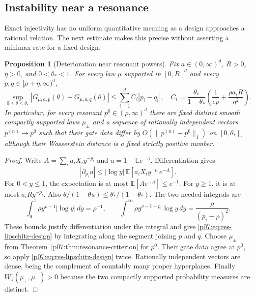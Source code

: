\documentclass[11pt,letterpaper]{article}
\newtheorem{proposition}[theorem]{Proposition}
\theoremstyle{definition}
\theoremstyle{remark}
\newcommand{\1}{\mathbf 1}
\begin{document}
\subsection{Instability near a resonance}

Exact injectivity has no uniform quantitative meaning as a design
approaches a rational relation.  The next estimate makes this precise
without asserting a minimax rate for a fixed design.

\begin{proposition}[Deterioration near resonant powers]
\label{p07:prop:res-stability}
Fix $a\in(0,\infty)^d$, $R>0$, $\eta>0$, and
$0<\theta_*<1$.  For every law $\mu$ supported in $[0,R]^d$ and
every $p,q\in[\rho+\eta,\infty)^d$,
\begin{equation}\label{p07:eq:res-lipschitz-design}
 \sup_{0\leq\theta\leq\theta_*}
 |G_{\mu,a,p}(\theta)-G_{\mu,a,q}(\theta)|
 \leq\sum_{i=1}^d C_i|p_i-q_i|,
 \quad
 C_i=\frac{\theta_*}{1-\theta_*}
 \left(\frac1{e\rho}+\frac{\rho a_iR}{\eta^2}\right).
\end{equation}
In particular, for every resonant $p^0\in(\rho,\infty)^d$ there
are fixed distinct smooth compactly supported laws $\mu_\pm$ and
a sequence of rationally independent vectors $p^{(n)}\to p^0$ such
that their gate data differ by $O(\|p^{(n)}-p^0\|_1)$ on
$[0,\theta_*]$, although their Wasserstein distance is a fixed
strictly positive number.
\end{proposition}

\begin{proof}
Write $A=\sum_i a_iX_i y^{-p_i}$ and
$u=1-\mathbb E e^{-A}$.  Differentiation gives
\[
 |\partial_{p_i}u|
 \leq |\log y|\,\mathbb E[a_iX_i y^{-p_i}e^{-A}].
\]
For $0<y\leq1$, the expectation is at most
$\mathbb E[Ae^{-A}]\leq e^{-1}$.
For $y\geq1$, it is at most $a_iR y^{-p_i}$.
Also $\theta/(1-\theta u)\leq\theta_* /(1-\theta_*)$.
The two needed integrals are
\[
 \int_0^1\rho y^{\rho-1}|\log y|\,dy=\rho^{-1},
 \qquad
 \int_1^\infty\rho y^{\rho-1-p_i}\log y\,dy
       =\frac{\rho}{(p_i-\rho)^2}.
\]
These bounds justify differentiation under the integral and give
\eqref{p07:eq:res-lipschitz-design} by integrating along the segment
joining $p$ and $q$.
Choose $\mu_\pm$ from Theorem~\ref{p07:thm:resonance-criterion}
for $p^0$.  Their gate data agree at $p^0$, so apply
\eqref{p07:eq:res-lipschitz-design} twice.  Rationally independent vectors
are dense, being the complement of countably many proper hyperplanes.
Finally $W_1(\mu_+,\mu_-)>0$ because the two compactly supported
probability measures are distinct.
\end{proof}
\end{document}
